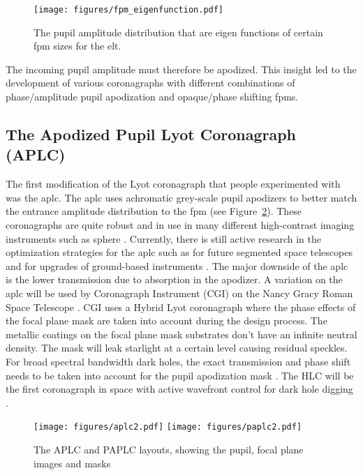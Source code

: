 \documentclass[letterpaper]{ar-1col}
\begin{document}
\begin{figure}[ht]
  \centering
  \texttt{[image: figures/fpm\_eigenfunction.pdf]}
  \caption{The pupil amplitude distribution that are eigen functions of certain \ac{fpm} sizes for the \ac{elt}.}
  \label{fig:fpm_eigenfunctions}
\end{figure}

The incoming pupil amplitude must therefore be apodized.
%
This insight led to the development of various coronagraphs with different combinations of phase/amplitude pupil apodization and opaque/phase shifting \acp{fpm}.

\subsection{The Apodized Pupil Lyot Coronagraph (APLC)}

The first modification of the Lyot coronagraph that people experimented with was the \ac{aplc}.
%
The \ac{aplc} uses achromatic grey-scale pupil apodizers to better match the entrance amplitude distribution to the \ac{fpm} (see Figure~\ref{fig:coro_aplc}).
%
These coronagraphs are quite robust and in use in many different high-contrast imaging instruments such as \ac{sphere} \citep{beuzit2019sphere}.
%
Currently, there is still active research in the optimization strategies for the \ac{aplc} such as for future segmented space telescopes \citep{zimmerman2016lyot} and for upgrades of ground-based instruments \citep{nickson2022aplc}.
%
The major downside of the \ac{aplc} is the lower transmission due to absorption in the apodizer.
%
A variation on the \ac{aplc} will be used by Coronagraph Instrument (CGI) on the Nancy Gracy Roman Space Telescope \citep{krist2023end}. CGI uses a Hybrid Lyot coronagraph where the phase effects of the focal plane mask are taken into account during the design process. The metallic coatings on the focal plane mask substrates don't have an infinite neutral density. The mask will leak starlight at a certain level causing residual speckles. For broad spectral bandwidth dark holes, the exact transmission and phase shift needs to be taken into account for the pupil apodization mask \citep{kuchner2002coronagraph}. The HLC will be the first coronagraph in space with active wavefront control for dark hole digging \citep{krist2023end}.

\begin{figure}[ht]
  \centering
  \texttt{[image: figures/aplc2.pdf]}
  \texttt{[image: figures/paplc2.pdf]}
  \caption{The APLC and PAPLC layouts, showing the pupil, focal plane images and masks}
  \label{fig:coro_aplc}
\end{figure}
\end{document}
